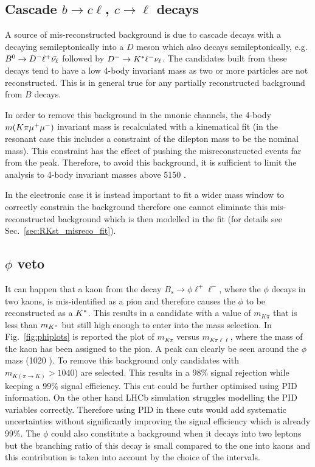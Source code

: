 \subsection{Cascade $b \rightarrow c\ell$, $c \rightarrow \ell$ decays}
\label{sec:RKst_peaking_Dchains}

A source of mis-reconstructed background is due to cascade decays with a \Bz decaying semileptonically
into a $D$ meson which also decays semileptonically, e.g. ${{B}^0}\rightarrow D^{-} \ell^+ \bar{\nu_\ell}$
followed by $D^{-} \rightarrow {\ensuremath{{K}^*}} \ell^- \nu_\ell$. The candidates built from these decays tend to have a low
4-body invariant mass as two or more particles are not reconstructed. This is in general true for
any partially reconstructed background from $B$ decays.

In order to remove this background in the muonic channels, the 4-body $m(K\pi\mumu)$ invariant mass is recalculated
with a kinematical fit (in the resonant case this includes a constraint of the dilepton mass to be the \jpsi nominal mass).
This constraint has the effect of pushing the misreconstructed events far from the \Bz peak.
Therefore, to avoid this background, it is sufficient to limit the analysis to 4-body invariant masses
above 5150 \mevcc. %

In the electronic case it is instead important to fit a wider mass window to correctly constrain the background
therefore one cannot eliminate this mis-reconstructed background which is then modelled in the fit
(for details see Sec.~\ref{sec:RKst_misreco_fit}).


\subsection{$\phi$ veto}

It can happen that a kaon from the decay $B_s \rightarrow \phi \ell^+\ell^-$, where the $\phi$ decays in two kaons,
is mis-identified as a pion and therefore causes the $\phi$ to be reconstructed as a ${{K}^*}$. This results in
a candidate with a value of $m_{K\pi}$ that is less than $m_{{{K}^*}}$ but still high enough to
enter into the mass selection. In Fig.~\ref{fig:phiplots} is reported the plot of $m_{K\pi}$ versus
$m_{K\pi \ell\ell}$, where the mass of the kaon has been assigned to the pion. A peak can clearly be seen
around the $\phi$ mass (1020 \mevcc).
To remove this background only candidates with $m_{K(\pi\rightarrow K)} > 1040$) are selected.
This results in a 98\% signal rejection while keeping a 99\% signal efficiency.
This cut could be further optimised using PID information. On the other hand LHCb simulation 
struggles modelling the PID variables correctly. Therefore using PID in these cuts would
add systematic uncertainties without significantly improving the signal efficiency which is already 99\%.
The $\phi$ could also constitute a background when it decays into two leptons but the
branching ratio of this decay is small compared to the one into kaons and this
contribution is taken into account by the choice of the \qsq intervals.

